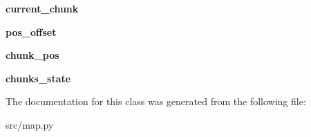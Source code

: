 \begin{DoxyCompactItemize}
\item 
\hypertarget{classsrc_1_1map_1_1_map_viewer_a084bd729a289751d881444ca5154192b}{{\bfseries current\-\_\-chunk}}\label{classsrc_1_1map_1_1_map_viewer_a084bd729a289751d881444ca5154192b}

\item 
\hypertarget{classsrc_1_1map_1_1_map_viewer_a78602046c0d74ec7e969f6558216ea68}{{\bfseries pos\-\_\-offset}}\label{classsrc_1_1map_1_1_map_viewer_a78602046c0d74ec7e969f6558216ea68}

\item 
\hypertarget{classsrc_1_1map_1_1_map_viewer_aeb83e9eb17ada2dc3f46ba3bd21eda47}{{\bfseries chunk\-\_\-pos}}\label{classsrc_1_1map_1_1_map_viewer_aeb83e9eb17ada2dc3f46ba3bd21eda47}

\item 
\hypertarget{classsrc_1_1map_1_1_map_viewer_a235b396649899f2075c63ee695b4513f}{{\bfseries chunks\-\_\-state}}\label{classsrc_1_1map_1_1_map_viewer_a235b396649899f2075c63ee695b4513f}

\end{DoxyCompactItemize}


\-The documentation for this class was generated from the following file\-:\begin{DoxyCompactItemize}
\item 
src/map.\-py\end{DoxyCompactItemize}
